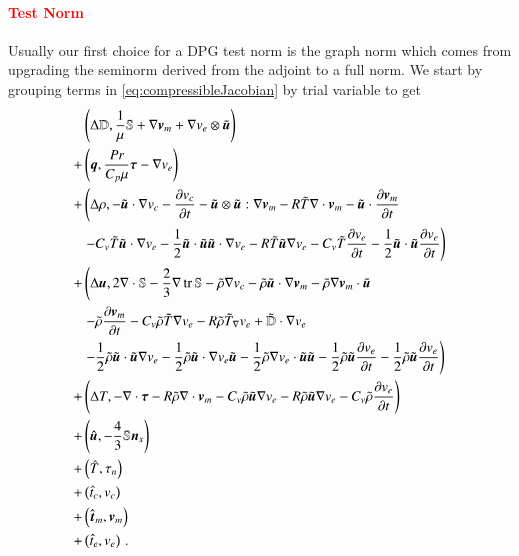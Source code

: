 \documentclass[preprint,12pt]{elsarticle}
\begin{document}
\paragraph{\textcolor{red}{Test Norm}}
Usually our first choice for a DPG test norm is the graph norm which comes from upgrading the seminorm derived from the 
adjoint to a full norm.
We start by grouping terms in \eqref{eq:compressibleJacobian} by trial variable to get
\begin{equation}
\begin{aligned}
&\left( \Delta\mathbb{D},\frac{1}{\mu}\mathbb{S}+\nabla\boldsymbol v_m+\nabla v_e\otimes\tilde{\boldsymbol u} \right)\\
+&\left( \boldsymbol q,\frac{Pr}{C_p\mu}\boldsymbol\tau-\nabla v_e \right)\\
+&\left(\Delta\rho,-\tilde{\boldsymbol u}\cdot\nabla v_c-\frac{\partial v_c}{\partial t}
-\tilde{\boldsymbol u}\otimes\tilde{\boldsymbol u}:\nabla\boldsymbol v_m
-R\tilde T\nabla\cdot\boldsymbol v_m-\tilde{\boldsymbol u}\cdot\frac{\partial\boldsymbol v_m}{\partial t}\right.\\
&\left.-C_v\tilde T\tilde{\boldsymbol u}\cdot\nabla v_e-\frac{1}{2}\tilde{\boldsymbol u}\cdot\tilde{\boldsymbol u}\tilde{\boldsymbol u}\cdot\nabla v_e
-R\tilde T\tilde{\boldsymbol u}\nabla v_e
-C_v\tilde T\frac{\partial v_e}{\partial t}-\frac{1}{2}\tilde{\boldsymbol u}\cdot\tilde{\boldsymbol u}\frac{\partial v_e}{\partial t}
\right)\\
+&\left(\Delta\boldsymbol u,2\nabla\cdot\mathbb{S}-\frac{2}{3}\nabla\operatorname*{tr}{\mathbb{S}}
-\tilde\rho\nabla v_c
-\tilde\rho\tilde{\boldsymbol u}\cdot\nabla\boldsymbol v_m-\tilde\rho\nabla\boldsymbol v_m\cdot\tilde{\boldsymbol u}
\right.\\
&\left.
-\tilde\rho\frac{\partial\boldsymbol v_m}{\partial t}
-C_v\tilde\rho\tilde T\nabla v_e
-R\tilde\rho\tilde T_{\nabla} v_e
+\tilde{\mathbb{D}}\cdot\nabla v_e
\right.\\
&\left.
-\frac{1}{2}\tilde\rho\tilde{\boldsymbol u}\cdot\tilde{\boldsymbol u}\nabla v_e
-\frac{1}{2}\tilde\rho\tilde{\boldsymbol u}\cdot\nabla v_e\tilde{\boldsymbol u}
-\frac{1}{2}\tilde\rho\nabla v_e\cdot\tilde{\boldsymbol u}\tilde{\boldsymbol u}
-\frac{1}{2}\tilde\rho\tilde{\boldsymbol u}\frac{\partial v_e}{\partial t}
-\frac{1}{2}\tilde\rho\tilde{\boldsymbol u}\frac{\partial v_e}{\partial t}
\right)\\
+&\left(\Delta T,-\nabla\cdot\boldsymbol\tau
-R\tilde\rho\nabla\cdot\boldsymbol v_m
-C_v\tilde\rho\tilde{\boldsymbol u}\nabla v_e
-R\tilde\rho\tilde{\boldsymbol u}\nabla v_e
-C_v\tilde\rho\frac{\partial v_e}{\partial t}
\right)\\
+&\left( \hat{\boldsymbol u},-\frac{4}{3}\mathbb{S}\boldsymbol n_x \right)\\
+&\left( \hat T,\tau_n \right)\\
+&\left( \hat t_c,v_c \right)\\
+&\left( \hat{\boldsymbol t}_m,\boldsymbol v_m \right)\\
+&\left( \hat t_e,v_e \right)\,.
\end{aligned}	
\end{equation}
\end{document}
